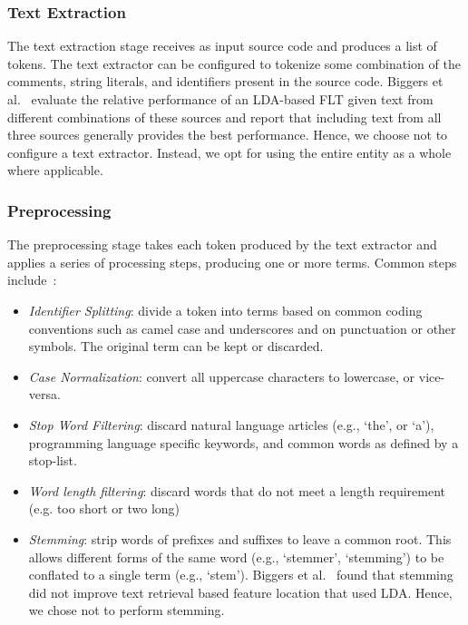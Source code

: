     \subsubsection{Text Extraction}
    The text extraction stage receives as input source code and produces a list of tokens.
    The text extractor can be configured to tokenize some combination of
    the comments, string literals, and identifiers present in the source code.
    Biggers et al.~\cite{Biggers_etal:2014} evaluate the relative performance of an LDA-based FLT
    given text from different combinations of these sources
    and report that including text from all three sources generally provides the best performance.
    Hence, we choose not to configure a text extractor.
    Instead, we opt for using the entire entity as a whole where applicable.

    \subsubsection{Preprocessing}
    \label{sec:preprocessing}
    The preprocessing stage takes each token produced by the text extractor
    and applies a series of processing steps, producing one or more terms.
    Common steps include~\cite{Marcus-etal:2004, Marcus-Menzies:2010}:
    \begin{itemize}
    \setlength{\itemsep}{1pt}
    \item \textit{Identifier Splitting}:
    divide a token into terms based on common coding conventions
    such as camel case and underscores and on punctuation or other symbols.
    The original term can be kept or discarded.
    \item \textit{Case Normalization}:
    convert all uppercase characters to lowercase, or vice-versa.
    \item \textit{Stop Word Filtering}:
    discard natural language articles (e.g., ‘the’, or ‘a’),
    programming language specific keywords,
    and common words as defined by a stop-list.
    \item \textit{Word length filtering}:
    discard words that do not meet a length requirement (e.g. too short or two long)
    \item \textit{Stemming}:
    strip words of prefixes and suffixes to leave a common root.
    This allows different forms of the same word
    (e.g., ‘stemmer’, ‘stemming’)
    to be conflated to a single term
    (e.g., ‘stem’).
    Biggers et al.~\cite{Biggers_etal:SERG-2012-03.R1} found that stemming did not improve text retrieval based feature location that used LDA.
    Hence, we chose not to perform stemming.
    \end{itemize}

